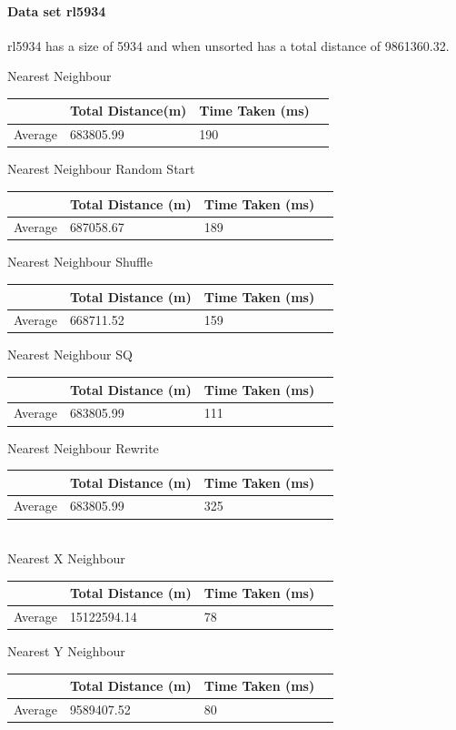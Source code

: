 \documentclass[conference,backref=page]{acmsiggraph}
\begin{document}
\paragraph{Data set rl5934} \hfill

rl5934 has a size of 5934 and when unsorted has a total distance of 9861360.32.

\begin{center}	
	
	Nearest Neighbour
	\begin{tabular}{| l | l | l | l |}
		\hline
		& Total Distance(m)& Time Taken (ms)\\ \hline
		Average & 683805.99 & 190 \\ \hline
	\end{tabular}
	
	Nearest Neighbour Random Start
	\begin{tabular}{| l | l | l | l |}
		\hline
		& Total Distance (m) & Time Taken (ms)\\ \hline
		Average & 687058.67 & 189 \\ \hline
	\end{tabular}
	
	Nearest Neighbour Shuffle
	\begin{tabular}{| l | l | l | l |}
		\hline
		& Total Distance (m) & Time Taken (ms)\\ \hline
		Average & 668711.52 & 159 \\ \hline
	\end{tabular}
	
	
	Nearest Neighbour SQ
	\begin{tabular}{| l | l | l | l |}
		\hline
		& Total Distance (m) & Time Taken (ms)\\ \hline
		Average & 683805.99 & 111 \\ \hline
	\end{tabular}
	
	Nearest Neighbour Rewrite
	\begin{tabular}{| l | l | l | l |}
		\hline
		& Total Distance (m) & Time Taken (ms)\\ \hline
		Average & 683805.99 & 325 \\ \hline
	\end{tabular}\\
	
	Nearest X Neighbour	
	\begin{tabular}{| l | l | l | l |}
		\hline
		& Total Distance (m) & Time Taken (ms)\\ \hline
		Average & 15122594.14 & 78 \\ \hline	
	\end{tabular}
	
	Nearest Y Neighbour	
	\begin{tabular}{| l | l | l | l |}
		\hline
		& Total Distance (m) & Time Taken (ms)\\ \hline
		Average & 9589407.52 & 80 \\ \hline
	\end{tabular}
\end{center}
\end{document}
